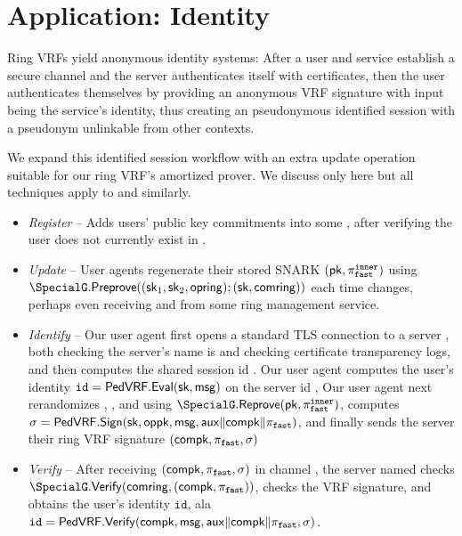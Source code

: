\section{Application: Identity}
\label{sec:app_identity}

Ring VRFs yield anonymous identity systems:
After a user and service establish a secure channel and
the server authenticates itself with certificates, then
the user authenticates themselves by providing an anonymous
VRF signature with input \msg being the service's identity,
thus creating an pseudonymous identified session with
a pseudonym unlinkable from other contexts.

We expand this identified session workflow with an extra
update operation suitable for our ring VRF's amortized prover.
We discuss only \pifast here but all techniques apply to \pisk and \pipk similarly. 

\begin{itemize}
\item {\em Register} --
 Adds users' public key commitments into some \ring,
 after verifying the user does not currently exist in \ring.
\item {\em Update} --
 User agents regenerate their stored SNARK $(\mathsf{pk},\pi_{\mathtt{fast}}^{\mathtt{inner}})$ using
 $\SpecialG.\Preprove( (\sk_1,\sk_2,\openring); (\sk,\comring) )$
 each time \ring changes, perhaps even receiving \comring and \openring
 from some ring management service.
\item {\em Identify} --
 Our user agent first opens a standard TLS connection to a server \msg,
 both checking the server's name is \msg and checking certificate
 transparency logs, and then computes the shared session id \aux.
 Our user agent computes the user's identity
  $\mathtt{id} = {\mathsf{PedVRF}}.{\mathsf{Eval}}(\mathsf{sk},\mathsf{msg})$ on the server id \msg,
 Our user agent next rerandomizes \pifast, \compk, and \openpk using
 $\SpecialG.\Reprove( \pk, \pifast^\inner )$, computes
  $\sigma = {\mathsf{PedVRF}}.{\mathsf{Sign}}(\mathsf{sk},\mathsf{oppk},\mathsf{msg},\mathsf{aux} \| \mathsf{compk} \| \pi_{\mathtt{fast}})$,
 and finally sends the server their ring VRF signature $(\mathsf{compk},\pi_{\mathtt{fast}},\sigma)$
\item {\em Verify} -- 
 After receiving $(\mathsf{compk},\pi_{\mathtt{fast}},\sigma)$ in channel \aux,
 the server named \msg checks $\SpecialG.\Verify( \comring, (\compk,\pifast) )$,
 checks the VRF signature, and obtains the user's identity $\mathtt{id}$, ala \\
 $\mathtt{id} = {\mathsf{PedVRF}}.{\mathsf{Verify}}(\mathsf{compk},\mathsf{msg},\mathsf{aux} \| \mathsf{compk} \| \pi_{\mathtt{fast}},\sigma)$.
\end{itemize}


